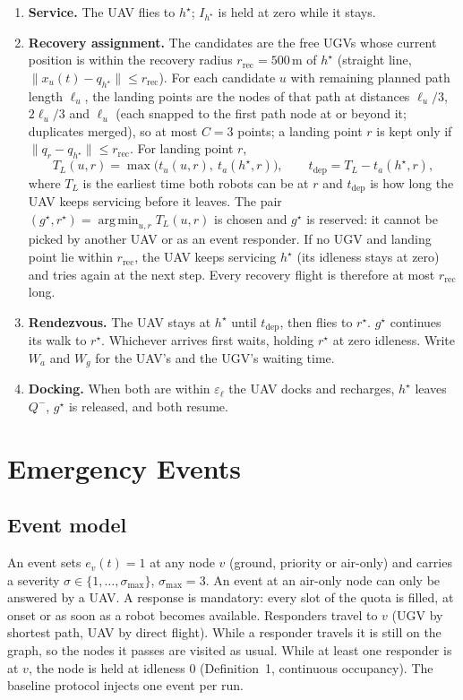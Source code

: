 \documentclass[11pt]{article}
\DeclareMathOperator*{\argmin}{arg\,min}
\theoremstyle{definition}
\theoremstyle{plain}
\begin{document}
\begin{enumerate}
\item \textbf{Service.} The UAV flies to $h^\star$; $I_{h^\star}$ is held at
zero while it stays.
\item \textbf{Recovery assignment.} The candidates are the free UGVs whose
current position is within the recovery radius $r_{\mathrm{rec}} = 500$\,m of $h^\star$
(straight line, $\|x_u(t) - q_{h^\star}\| \leq r_{\mathrm{rec}}$). For each candidate $u$ with remaining planned path length $\ell_u$, the landing
points are the nodes of that path at distances $\ell_u/3$, $2\ell_u/3$ and
$\ell_u$ (each snapped to the first path node at or beyond it; duplicates
merged), so at most $C = 3$ points; a landing point $r$ is kept only if
$\|q_r - q_{h^\star}\| \leq r_{\mathrm{rec}}$. For landing point $r$,
\begin{equation}
T_L(u, r) = \max\big( t_u(u, r),\ t_a(h^\star, r) \big), \qquad
t_{\mathrm{dep}} = T_L - t_a(h^\star, r),
\end{equation}
where $T_L$ is the earliest time both robots can be at $r$ and
$t_{\mathrm{dep}}$ is how long the UAV keeps servicing before it leaves.
The pair $(g^\star, r^\star) = \argmin_{u, r} T_L(u, r)$ is chosen and
$g^\star$ is reserved: it cannot be picked by another UAV or as an event
responder. If no UGV and landing point lie within $r_{\mathrm{rec}}$, the UAV keeps
servicing $h^\star$ (its idleness stays at zero) and tries again at the next
step. Every recovery flight is therefore at most $r_{\mathrm{rec}}$ long.
\item \textbf{Rendezvous.} The UAV stays at $h^\star$ until
$t_{\mathrm{dep}}$, then flies to $r^\star$. $g^\star$ continues its walk to
$r^\star$. Whichever arrives first waits, holding $r^\star$ at zero
idleness. Write $W_a$ and $W_g$ for the UAV's and the UGV's waiting time.
\item \textbf{Docking.} When both are within $\varepsilon_\ell$ the UAV
docks and recharges, $h^\star$ leaves $Q^-$, $g^\star$ is released, and
both resume.
\end{enumerate}

\section{Emergency Events}

\label{sec:events}
\subsection{Event model}
An event sets $e_v(t) = 1$ at any node $v$ (ground, priority or air-only)
and carries a severity $\sigma \in \{1, \ldots, \sigma_{\max}\}$,
$\sigma_{\max} = 3$. An event at an air-only node can only be answered by a
UAV. A response is mandatory: every slot of the quota is filled, at onset
or as soon as a robot becomes available. Responders travel to $v$ (UGV by
shortest path, UAV by direct flight). While a responder travels it is
still on the graph, so the nodes it passes are visited as usual. While at
least one responder is at $v$, the node is held at idleness 0
(Definition~1, continuous occupancy). The baseline protocol injects one
event per run.
\end{document}

